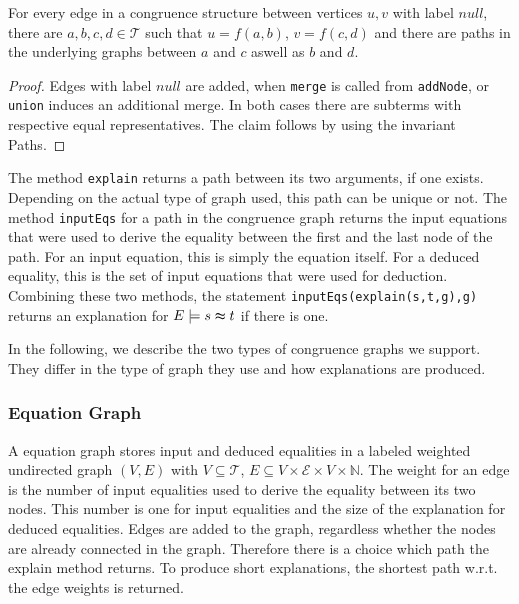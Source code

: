 \begin{invariant}

For every edge in a congruence structure between vertices $u,v$ with label $null$, 
there are $a,b,c,d \in \mathcal{T}$ such that $u = f(a,b)$, $v = f(c,d)$ and
there are paths in the underlying graphs between $a$ and $c$ aswell as $b$ and $d$.

\end{invariant}

\begin{proof}

Edges with label $null$ are added, when \texttt{merge} is called from \texttt{addNode}, or \texttt{union} induces an additional merge.
In both cases there are subterms with respective equal representatives.
The claim follows by using the invariant Paths.

\end{proof}

The method \texttt{explain} returns a path between its two arguments, if one exists.
Depending on the actual type of graph used, this path can be unique or not.
The method \texttt{inputEqs} for a path in the congruence graph returns the input equations that were used to derive the equality between the first and the last node of the path.
For an input equation, this is simply the equation itself.
For a deduced equality, this is the set of input equations that were used for deduction.
Combining these two methods, the statement \texttt{inputEqs(explain(s,t,g),g)} returns an explanation for $E \models s \thickapprox t$ if there is one.



In the following, we describe the two types of congruence graphs we support.
They differ in the type of graph they use and how explanations are produced.

\subsubsection*{Equation Graph}

A equation graph stores input and deduced equalities in a labeled weighted undirected graph $(V,E)$ with 
$V \subseteq \mathcal{T}$, $E \subseteq V \times \mathcal{E} \times V \times \mathbb{N}$.
The weight for an edge is the number of input equalities used to derive the equality between its two nodes.
This number is one for input equalities and the size of the explanation for deduced equalities.
Edges are added to the graph, regardless whether the nodes are already connected in the graph.
Therefore there is a choice which path the explain method returns.
To produce short explanations, the shortest path w.r.t. the edge weights is returned.

